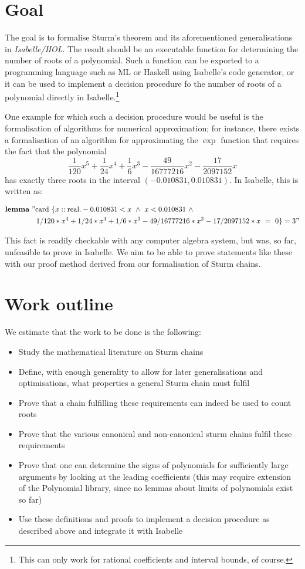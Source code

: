 \documentclass[11pt,a4paper,oneside]{article}
\newcommand{\isabellehol}{\mbox{Isabelle}\slash HOL\xspace}
\begin{document}
\section{Goal}

The goal is to formalise Sturm's theorem and its aforementioned generalisations 
in \emph{\isabellehol}. The result should be an executable function for 
determining the number of roots of a polynomial. Such a function can be 
exported to a programming language such as ML or Haskell using Isabelle's 
code generator, or it can be used to implement a decision procedure fo the 
number of roots of a polynomial directly in Isabelle.\footnote{This can only work for rational coefficients and interval bounds, of course.}

One example for which such a decision procedure would be useful is the 
formalisation of algorithms for numerical approximation; for instance, there 
exists a formalisation of an algorithm for approximating the $\exp$ function 
that requires the fact that the polynomial 
$$\frac{1}{120}x^5+\frac{1}{24}x^4+\frac{1}{6}x^3-\frac{49}{16777216}x^2-\frac{17}{2097152}x$$
has exactly three roots in the interval $(-0.010831,0.010831)$. In Isabelle, this 
is written as:

\vspace*{-5mm}
\begin{align*}
&\textbf{lemma}\ "\mathrm{card}\ \{x::\mathrm{real}. -0.010831 < x\ \wedge\ x < 0.010831\ \wedge\\
&\hskip15mm 1/120*x^4 + 1/24*x^4 + 1/6*x^3 - 49/16777216*x^2 - 17/2097152*x\ =\ 0\} = 3"
\end{align*}

This fact is readily checkable with any computer algebra system, but was, so far, 
unfeasible to prove in Isabelle. We aim to be able to prove statements like these 
with our proof method derived from our formalisation of Sturm chains.


\section{Work outline}
We estimate that the work to be done is the following:
\begin{itemize}
\item Study the mathematical literature on Sturm chains
\item Define, with enough generality to allow for later generalisations and optimisations, what 
      properties a general Sturm chain must fulfil
\item Prove that a chain fulfilling these requirements can indeed be used to count roots
\item Prove that the various canonical and non-canonical sturm chains fulfil these requirements
\item Prove that one can determine the signs of polynomials for sufficiently large arguments by 
      looking at the leading coefficients (this may require extension of the Polynomial library,
      since no lemmas about limits of polynomials exist so far)
\item Use these definitions and proofs to implement a decision procedure as described above and 
      integrate it with Isabelle
\end{itemize}
\end{document}
